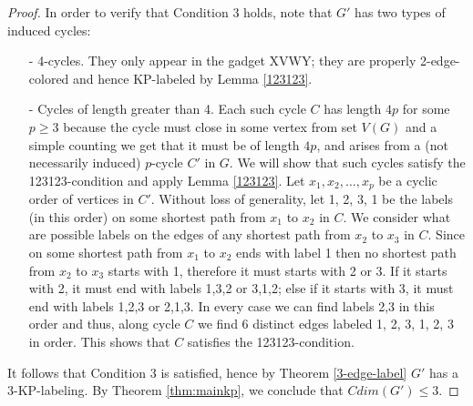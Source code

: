 \documentclass[12pt,a4paper,titlepage,openany]{report}
\begin{document}
\begin{proof}
In order to verify that Condition 3 holds, note that $G'$ has two types of induced cycles:
\begin{enumerate}
\item[-] 4-cycles. They only appear in the gadget XVWY; they are properly 2-edge-colored and hence KP-labeled by Lemma \ref{123123}.
\item[-] Cycles of length greater than 4. Each such cycle $C$ has length $4p$ for some $p \geq 3$ because the cycle must close in some vertex from set $V(G)$ and a simple counting we get that it must be of length $4p$, and arises from a (not necessarily induced) $p$-cycle $C'$ in $G$. We will show that such cycles satisfy the 123123-condition and apply Lemma \ref{123123}. Let $x_1, x_2,\ldots, x_p$ be a cyclic order of vertices in $C'$. Without loss of generality, let 1, 2, 3, 1 be the labels (in this order) on some shortest path from $x_1$ to $x_2$ in $C$. We consider what are possible labels on the edges of any shortest path from $x_2$ to $x_3$ in $C$. Since on some shortest path from $x_1$ to $x_2$ ends with label 1 then no shortest path from $x_2$ to $x_3$ starts with 1, therefore it must starts with 2 or 3. If it starts with 2, it must end with labels 1,3,2 or 3,1,2; else if it starts with 3, it must end with labels 1,2,3 or 2,1,3. In every case we can find labels 2,3 in this order and thus, along cycle $C$ we find 6 distinct edges labeled 1, 2, 3, 1, 2, 3 in order. This shows that $C$ satisfies the 123123-condition.
\end{enumerate}
It follows that Condition 3 is satisfied, hence by Theorem \ref{3-edge-label} $G'$ has a 3-KP-labeling. By Theorem \ref{thm:mainkp}, we conclude that $Cdim(G') \leq 3$.  
\end{proof}
\end{document}
